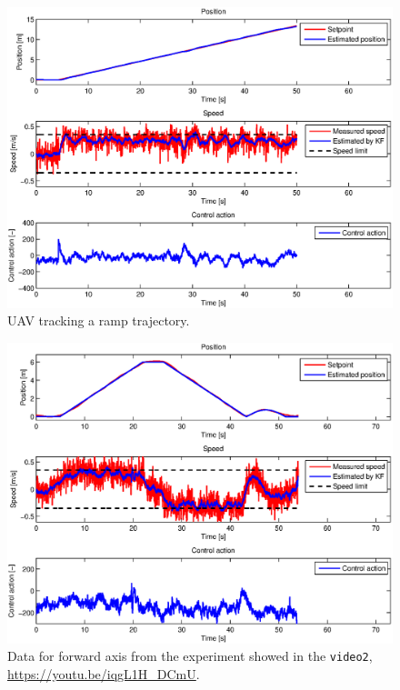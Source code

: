 \begin{figure}[H]
\centering
\begin{sideways}
\includegraphics[scale=0.99]{fig/experiment_ramp.eps}
\end{sideways}
\caption*{UAV tracking a ramp trajectory.}
\end{figure}

\begin{figure}[H]
\centering
\begin{sideways}
\includegraphics[scale=0.99]{fig/experiment_outdoor_2_ape.eps}
\end{sideways}
\caption*{Data for forward axis from the experiment showed in the \texttt{video2}, \url{https://youtu.be/iqgL1H_DCmU}.}
\end{figure}

